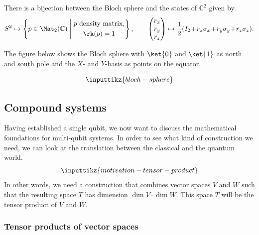 \documentclass[a4paper,oneside, 12pt]{amsart}
\begin{document}
\begin{corollary}\label{cor:Bloch-sphere-pure-state}
  There is a bijection between the Bloch sphere and the  states of \( \mathbb{C}^{2}\) given by
  \begin{equation}
    S^{2} \mapsto\left\{ p \in \Mat_{2}( \mathbb{C}) \;\middle\vert\;
      \begin{gathered}
      p \text{ density matrix,}\\
       \rk(p) = 1
      \end{gathered}\right\},
    \qquad
    \begin{pmatrix}
      r_{x} \\
      r_{y}\\
      r_{z}
    \end{pmatrix}
    \mapsto \frac{1}{2}(I_{2}\! +\! r_{x}\sigma_{x}\! +\! r_{y}\sigma_{y}\! +\! r_{z} \sigma_{z}).
  \end{equation}
\end{corollary}

The figure below shows the Bloch sphere with \(\ket{0}\) and \(\ket{1}\) as north and south pole and the \(X\)- and \(Y\)-basis as points on the equator.

\begin{equation*}
  \inputtikz{bloch-sphere}
\end{equation*}


\subsection{Compound systems}\label{sec:compound-systems}
Having established a single qubit, we now want to discuss the mathematical foundations for multi-qubit systems.
In order to see what kind of construction we need, we can look at the translation between the classical and the quantum world.
\begin{equation*}
  \inputtikz{motivation-tensor-product}
\end{equation*}
In other words, we need a construction that combines vector spaces \(V\) and \(W\) such that the resulting space \(T\) has dimension \(\dim V \cdot \dim W\).
This space \(T\) will be the tensor product of \(V\) and \(W\).

\subsubsection{Tensor products of vector spaces}\label{sec:tensor-products-of-vector-spaces}
\end{document}
